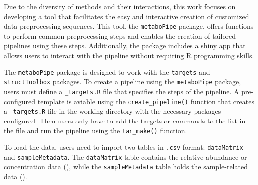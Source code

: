 \documentclass[ENG, BIB]{TFUOC}%
\begin{document}

Due to the diversity of methods and their interactions, this work focuses on developing a tool that facilitates the easy and interactive creation of customized data preprocessing sequences. This tool, the \texttt{metaboPipe} package, offers functions to perform common preprocessing steps and enables the creation of tailored pipelines using these steps. Additionally, the package includes a shiny app that allows users to interact with the pipeline without requiring R programming skills.

The \texttt{metaboPipe} package is designed to work with the \texttt{targets} and \texttt{structToolbox} packages. To create a pipeline using the \texttt{metaboPipe} package, users must define a \texttt{\_targets.R} file that specifies the steps of the pipeline. A pre-configured template is aviable using the \texttt{create\_pipeline()} function that creates a \texttt{\_targets.R} file in the working directory with the necessary packages configured. Then users only have to add the targets or commands to the list in the file and run the pipeline using the \texttt{tar\_make()} function.

To load the data, users need to import two tables in \texttt{.csv} format: \texttt{dataMatrix} and \texttt{sampleMetadata}. The \texttt{dataMatrix} table contains the relative abundance or concentration data (), while the \texttt{sampleMetadata} table holds the sample-related data ().
\end{document}
